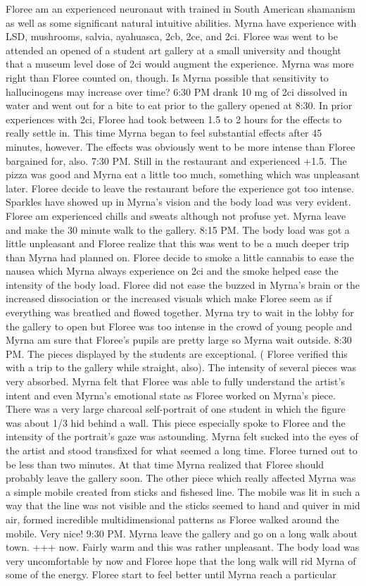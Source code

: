 \documentclass[12pt]{book}
\begin{document}
Floree am an experienced neuronaut with trained in South American shamanism as well as some significant natural intuitive abilities. Myrna have experience with LSD, mushrooms, salvia, ayahuasca, 2cb, 2ce, and 2ci. Floree was went to be attended an opened of a student art gallery at a small university and thought that a museum level dose of 2ci would augment the experience. Myrna was more right than Floree counted on, though. Is Myrna possible that sensitivity to hallucinogens may increase over time? 6:30 PM drank 10 mg of 2ci dissolved in water and went out for a bite to eat prior to the gallery opened at 8:30. In prior experiences with 2ci, Floree had took between 1.5 to 2 hours for the effects to really settle in. This time Myrna began to feel substantial effects after 45 minutes, however. The effects was obviously went to be more intense than Floree bargained for, also. 7:30 PM. Still in the restaurant and experienced +1.5. The pizza was good and Myrna eat a little too much, something which was unpleasant later. Floree decide to leave the restaurant before the experience got too intense. Sparkles have showed up in Myrna's vision and the body load was very evident. Floree am experienced chills and sweats although not profuse yet. Myrna leave and make the 30 minute walk to the gallery. 8:15 PM. The body load was got a little unpleasant and Floree realize that this was went to be a much deeper trip than Myrna had planned on. Floree decide to smoke a little cannabis to ease the nausea which Myrna always experience on 2ci and the smoke helped ease the intensity of the body load. Floree did not ease the buzzed in Myrna's brain or the increased dissociation or the increased visuals which make Floree seem as if everything was breathed and flowed together. Myrna try to wait in the lobby for the gallery to open but Floree was too intense in the crowd of young people and Myrna am sure that Floree's pupils are pretty large so Myrna wait outside. 8:30 PM. The pieces displayed by the students are exceptional. ( Floree verified this with a trip to the gallery while straight, also). The intensity of several pieces was very absorbed. Myrna felt that Floree was able to fully understand the artist's intent and even Myrna's emotional state as Floree worked on Myrna's piece. There was a very large charcoal self-portrait of one student in which the figure was about 1/3 hid behind a wall. This piece especially spoke to Floree and the intensity of the portrait's gaze was astounding. Myrna felt sucked into the eyes of the artist and stood transfixed for what seemed a long time. Floree turned out to be less than two minutes. At that time Myrna realized that Floree should probably leave the gallery soon. The other piece which really affected Myrna was a simple mobile created from sticks and fishesed line. The mobile was lit in such a way that the line was not visible and the sticks seemed to hand and quiver in mid air, formed incredible multidimensional patterns as Floree walked around the mobile. Very nice! 9:30 PM. Myrna leave the gallery and go on a long walk about town. +++ now. Fairly warm and this was rather unpleasant. The body load was very uncomfortable by now and Floree hope that the long walk will rid Myrna of some of the energy. Floree start to feel better until Myrna reach a particular 
\end{document}
